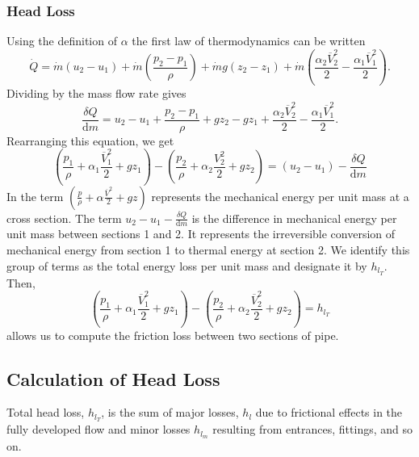 \subsubsection{Head Loss}
Using the definition of $\alpha$ the first law of thermodynamics can be written
\[ 
\dot{Q} = \dot{m} \left( u_2 - u_1 \right) + \dot{m} \left( \frac{p_2 - p_1}{\rho} \right) + \dot{m} g \left( z_2 - z_1 \right) + \dot{m} \left( \frac{\alpha_2 \overline{V}_2^2}{2} - \frac{\alpha_1 \overline{V}_{1}^2}{2} \right)
.\]
Dividing by the mass flow rate gives
\[ 
\frac{\delta Q}{\mathrm{d}m} = u_2 - u_1 + \frac{p_2 - p_1}{\rho} + gz_2 - gz_1 + \frac{\alpha_2 \overline{V}_2^2}{2} - \frac{\alpha_1 \overline{V}_1^2}{2}
.\]
Rearranging this equation, we get
\begin{equation} \label{eq:828}
 \left( \frac{p_1}{\rho} + \alpha_1 \frac{\overline{V}_1^2}{2} + gz_1 \right) - \left( \frac{p_2}{\rho} + \alpha_2 \frac{V_2^2}{2} + gz_2 \right) = \left( u_2 - u_1 \right) - \frac{\delta Q}{\mathrm{d}m}
\end{equation}
In  the term $\left( \frac{p}{\rho} + \alpha \frac{\overline{V}^2}{2} + gz \right)$ represents the mechanical energy per unit mass at a cross section.
The term $u_2 - u_1 - \frac{\delta Q}{\mathrm{d}m}$ is the difference in mechanical energy per unit mass between sections 1 and 2.
It represents the irreversible conversion of mechanical energy from section 1 to thermal energy at section 2.
We identify this group of terms as the total energy loss per unit mass and designate it by $h_{l_T}$.
Then,
\begin{equation}\label{eq:headloss}
  \left( \frac{p_1}{\rho} + \alpha_1 \frac{\overline{V}_1^2}{2} + gz_1 \right) - \left( \frac{p_2}{\rho} + \alpha_2 \frac{\overline{V}_2^2}{2} + gz_2 \right) = h_{l_T}
\end{equation}
 allows us to compute the friction loss between two sections of pipe. 


\subsection{Calculation of Head Loss}
Total head loss, $h_{l_T}$, is the sum of major losses, $h_l$ due to frictional effects in the fully developed flow and minor losses $h_{l_m}$ resulting from entrances, fittings, and so on.

